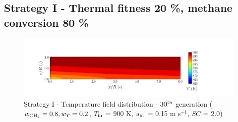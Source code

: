 \documentclass[preprint,12pt]{elsarticle}
\begin{document}

\clearpage


\subsection{Strategy I - Thermal fitness 20 \%, methane conversion 80 \%}
\label{subsec:S18020}

%

\begin{figure}[h!]
\centering
\includegraphics[width=150mm]{results/5/80C_20T/GEN30-TFIELD.png}
\caption{\label{fig:5R8020G30-TField} Strategy I - Temperature field distribution - 30$^{\rm{th}}$ generation ($w_{\rm{CH_4}} = 0.8, w_T = 0.2$, $T_{\rm{in}}$ = 900 K, $u_{\rm{in}}$ = 0.15 m s$^{-1}$, $SC$ = 2.0)}
\end{figure}

%
\end{document}
